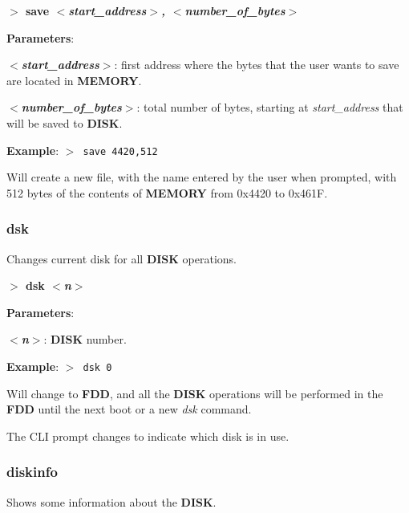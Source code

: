 \documentclass[a4paper,11pt]{article}
\begin{document}
        \hspace{1.9cm}\textbf{$>$ save \textit{$<$start\_address$>$,
        $<$number\_of\_bytes$>$}}

        \textbf{Parameters}:

        \hspace{1cm}\textbf{\textit{$<$start\_address$>$}}: first address where
        the bytes that the user wants to save are located in \textbf{MEMORY}.

        \hspace{1cm}\textbf{\textit{$<$number\_of\_bytes$>$}}: total number of
        bytes, starting at \textit{start\_address} that will be saved to
        \textbf{DISK}.
        
        \textbf{Example}: \texttt{$>$ save 4420,512}

        Will create a new file, with the name entered by the user when prompted,
        with 512 bytes of the contents of \textbf{MEMORY} from 0x4420 to 0x461F.

        \subsubsection{{\color{blue}dsk}}
        Changes current disk for all \textbf{DISK} operations.

        \hspace{1.9cm}\textbf{$>$ dsk \textit{$<$n$>$}}

        \textbf{Parameters}:

        \hspace{1cm}\textbf{\textit{$<$n$>$}}: \textbf{DISK} number.

        \textbf{Example}: \texttt{$>$ dsk 0}

        Will change to \textbf{FDD}, and all the \textbf{DISK} operations will
        be performed in the \textbf{FDD} until the next boot or a new \textit{dsk}
        command.

        The CLI prompt changes to indicate which disk is in use.

        \subsubsection{{\color{blue}diskinfo}}
        Shows some information about the \textbf{DISK}.
\end{document}
